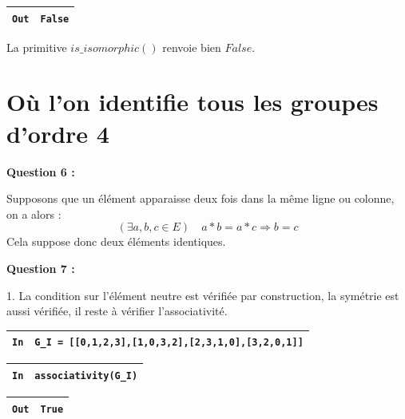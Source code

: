\documentclass[titlepage]{article}
\begin{document}
    \begin{tabularx}{11.5cm}{|p{0.60cm}|X|}
        \hline
        \verb|Out|
        & 
        \verb|False|
        \\
        \hline
    \end{tabularx}\newline

    La primitive $is\_isomorphic()$ renvoie bien $False$.

    \section{Où l’on identifie tous les groupes d’ordre 4}
    \textbf{Question 6 :}

    Supposons que un élément apparaisse deux fois dans la même ligne ou colonne, on a alors :
    \[(\exists a, b, c \in E) \quad a*b=a*c \Longrightarrow b = c\]
    Cela suppose donc deux éléments identiques.\newline

    \textbf{Question 7 :}

    1. La condition sur l'élément neutre est vérifiée par construction, la symétrie est aussi vérifiée, il reste à vérifier l'associativité.\newline
    
    \begin{tabularx}{11.5cm}{|p{0.60cm}|X|}
        \hline
        \verb|In|
        & 
        \verb|G_I = [[0,1,2,3],[1,0,3,2],[2,3,1,0],[3,2,0,1]]|
        \\
        \hline
    \end{tabularx}\newline
    \begin{tabularx}{11.5cm}{|p{0.60cm}|X|}
        \hline
        \verb|In|
        & 
        \verb|associativity(G_I)|
        \\
        \hline
    \end{tabularx}\newline
    \begin{tabularx}{11.5cm}{|p{0.60cm}|X|}
        \hline
        \verb|Out|
        & 
        \verb|True|
        \\
        \hline
    \end{tabularx}\newline\newline
\end{document}
